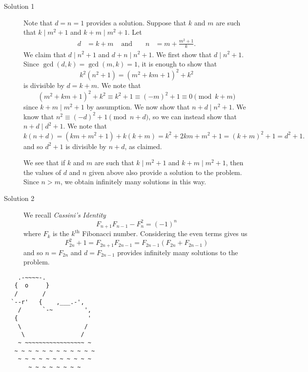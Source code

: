\documentclass{article}
\begin{document}
\begin{enumerate}[1.]
  \begin{description}
    \item[Solution 1] Note that $d = n = 1$ provides a solution. Suppose that $k$ and $m$ are such that $k \mid m^2 + 1$ and $k + m \mid m^2 + 1$. Let
    \begin{align*}
      d & = k + m & \text{ and } && n & = m + \frac{m^2 + 1}{k}.
    \end{align*}
    We claim that $d \mid n^2 + 1$ and $d + n \mid n^2 + 1$. We first show that $d \mid n^2 + 1$. Since $\gcd(d, k) = \gcd(m, k) = 1$, it is enough to show that
    \[
      k^2 (n^2 + 1) = (m^2 + km + 1)^2 + k^2
    \]
    is divisible by $d = k + m$. We note that
    \[
      (m^2 + km + 1)^2 + k^2 \equiv k^2 + 1 \equiv (-m)^2 + 1 \equiv 0 \pmod{k + m}
    \]
    since $k + m \mid m^2 + 1$ by assumption. We now show that $n + d \mid n^2 + 1$. We know that $n^2 \equiv (-d)^2 + 1 \pmod{n + d}$, so we can instead show that $n + d \mid d^2 + 1$. We note that
    \[
      k(n + d) = (km + m^2 + 1) + k(k + m) = k^2 + 2km + m^2 + 1 = (k + m)^2 + 1 = d^2 + 1.
    \]
    and so $d^2 + 1$ is divisible by $n + d$, as claimed.

    We see that if $k$ and $m$ are such that $k \mid m^2 + 1$ and $k + m \mid m^2 + 1$, then the values of $d$ and $n$ given above also provide a solution to the problem. Since $n > m$, we obtain infinitely many solutions in this way.

    \item[Solution 2] We recall \emph{Cassini's Identity}
    \[
      F_{n + 1} F_{n - 1} - F_n^2 = (-1)^n
    \] 
    where $F_k$ is the $k^\text{th}$ Fibonacci number. Considering the even terms gives us
    \[
      F_{2n}^2 + 1 = F_{2n + 1} F_{2n - 1} = F_{2n - 1} (F_{2n} + F_{2n - 1})
    \]
    and so $n = F_{2n}$ and $d = F_{2n - 1}$ provides infinitely many solutions to the problem.
  \end{description}

  \end{enumerate}
  
  \vfill
  \centering
  \begin{BVerbatim}
    .-~~~~-.
   {  o     }
   /       /
  `--r'   {    ,___.-',
    /      `-~         ',
   {                    '
    \                  /
     \                /
    ~ ~~~~~~~~~~~~~~~~~ ~
   ~ ~ ~ ~ ~ ~ ~ ~ ~ ~ ~ ~
    ~ ~ ~ ~ ~ ~ ~ ~ ~ ~ ~
       ~ ~ ~ ~ ~ ~ ~ ~
  \end{BVerbatim}
  
  
\end{document}
